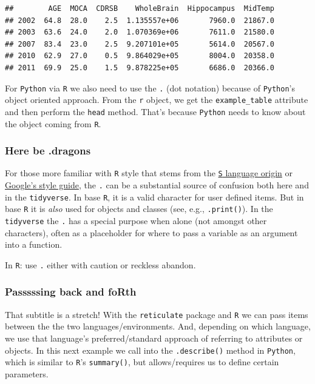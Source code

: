 \documentclass[]{article}
\begin{document}
\begin{verbatim}
##        AGE  MOCA  CDRSB    WholeBrain  Hippocampus  MidTemp
## 2002  64.8  28.0    2.5  1.135557e+06       7960.0  21867.0
## 2003  63.6  24.0    2.0  1.070369e+06       7611.0  21580.0
## 2007  83.4  23.0    2.5  9.207101e+05       5614.0  20567.0
## 2010  62.9  27.0    0.5  9.864029e+05       8004.0  20358.0
## 2011  69.9  25.0    1.5  9.878225e+05       6686.0  20366.0
\end{verbatim}

For \texttt{Python} via \texttt{R} we also need to use the \texttt{.}
(dot notation) because of \texttt{Python}'s object oriented approach.
From the \texttt{r} object, we get the \texttt{example\_table} attribute
and then perform the \texttt{head} method. That's because
\texttt{Python} needs to know about the object coming from \texttt{R}.

\hypertarget{here-be-.dragons}{%
\subsubsection{Here be .dragons}\label{here-be-.dragons}}

For those more familiar with \texttt{R} style that stems from the
\href{}{\texttt{S} language origin} or \href{}{Google's style guide},
the \texttt{.} can be a substantial source of confusion both here and in
the \texttt{tidyverse}. In base \texttt{R}, it is a valid character for
user defined items. But in base \texttt{R} it is \emph{also} used for
objects and classes (see, e.g., \texttt{.print()}). In the
\texttt{tidyverse} the \texttt{.} has a special purpose when alone (not
amongst other characters), often as a placeholder for where to pass a
variable as an argument into a function.

In \texttt{R}: use \texttt{.} either with caution or reckless abandon.

\hypertarget{passsssing-back-and-forth}{%
\subsubsection{Passsssing back and
foRth}\label{passsssing-back-and-forth}}

That subtitle is a stretch! With the \texttt{reticulate} package and
\texttt{R} we can pass items between the the two languages/environments.
And, depending on which language, we use that language's
preferred/standard approach of referring to attributes or objects. In
this next example we call into the \texttt{.describe()} method in
\texttt{Python}, which is similar to \texttt{R}'s \texttt{summary()},
but allows/requires us to define certain parameters.
\end{document}
